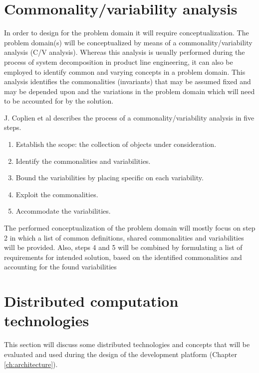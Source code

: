 \section{Commonality/variability analysis}
\label{sec:back:cv_analysis}
In order to design for the problem domain it will require conceptualization. The problem domain(s) will be conceptualized by means of a commonality/variability analysis (C/V analysis). Whereas this analysis is usually performed during the process of system decomposition in product line engineering, it can also be employed to identify common and varying concepts in a problem domain. This analysis identifies the commonalities (invariants) that may be assumed fixed and may be depended upon and the variations in the problem domain which will need to be accounted for by the solution.

J. Coplien et al \cite{cv_analysis} describes the process of a commonality/variability analysis in five steps.
\begin{enumerate}
\nospace
\item Establish the scope: the collection of objects under consideration.
\item Identify the commonalities and variabilities.
\item Bound the variabilities by placing specific on each variability.
\item Exploit the commonalities.
\item Accommodate the variabilities.
\end{enumerate}

The performed conceptualization of the problem domain will mostly focus on step 2 in which a list of common definitions, shared commonalities and variabilities will be provided. Also, steps 4 and 5 will be combined by formulating a list of requirements for intended solution, based on the identified commonalities and accounting for the found variabilities

\section{Distributed computation technologies}
This section will discuss some distributed technologies and concepts that will be evaluated and used during the design of the development platform (Chapter \ref{ch:architecture}).
\label{sec:back:tech}
